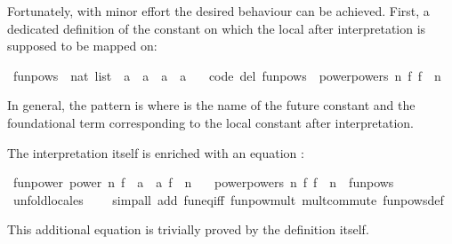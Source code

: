 \begin{isabellebody}
\begin{isamarkuptext}
  Fortunately, with minor effort the desired behaviour can be achieved.
  First, a dedicated definition of the constant on which the local 
  after interpretation is supposed to be mapped on:%
\end{isamarkuptext}%
\isamarkuptrue%
%
\isadelimquote
%
\endisadelimquote
%
\isatagquote
{}\isamarkupfalse%
\ funpows\ {\isacharcolon}{\isacharcolon}\ {\isachardoublequoteopen}nat\ list\ {\isasymRightarrow}\ {\isacharparenleft}{\isacharprime}a\ {\isasymRightarrow}\ {\isacharprime}a{\isacharparenright}\ {\isasymRightarrow}\ {\isacharprime}a\ {\isasymRightarrow}\ {\isacharprime}a{\isachardoublequoteclose}\ \isanewline
\ \ {\isacharbrackleft}code\ del{\isacharbrackright}{\isacharcolon}\ {\isachardoublequoteopen}funpows\ {\isacharequal}\ power{\isachardot}powers\ {\isacharparenleft}{\isasymlambda}n\ f{\isachardot}\ f\ {\isacharcircum}{\isacharcircum}\ n{\isacharparenright}{\isachardoublequoteclose}%
\endisatagquote
{\isafoldquote}%
%
\isadelimquote
%
\endisadelimquote
%
\begin{isamarkuptext}%
\noindent In general, the pattern is  where  is
  the name of the future constant and  the foundational term
  corresponding to the local constant after interpretation.

  The interpretation itself is enriched with an equation :%
\end{isamarkuptext}%
\isamarkuptrue%
%
\isadelimquote
%
\endisadelimquote
%
\isatagquote
{}\isamarkupfalse%
\ fun{\isacharunderscore}power{\isacharcolon}\ power\ {\isachardoublequoteopen}{\isasymlambda}n\ {\isacharparenleft}f\ {\isacharcolon}{\isacharcolon}\ {\isacharprime}a\ {\isasymRightarrow}\ {\isacharprime}a{\isacharparenright}{\isachardot}\ f\ {\isacharcircum}{\isacharcircum}\ n{\isachardoublequoteclose}\ \isanewline
\ \ {\isachardoublequoteopen}power{\isachardot}powers\ {\isacharparenleft}{\isasymlambda}n\ f{\isachardot}\ f\ {\isacharcircum}{\isacharcircum}\ n{\isacharparenright}\ {\isacharequal}\ funpows{\isachardoublequoteclose}\isanewline
\ \ \isamarkupfalse%
\ unfold{\isacharunderscore}locales\isanewline
\ \ \ \ {\isacharparenleft}simp{\isacharunderscore}all\ add{\isacharcolon}\ fun{\isacharunderscore}eq{\isacharunderscore}iff\ funpow{\isacharunderscore}mult\ mult{\isacharunderscore}commute\ funpows{\isacharunderscore}def{\isacharparenright}%
\endisatagquote
{\isafoldquote}%
%
\isadelimquote
%
\endisadelimquote
%
\begin{isamarkuptext}%
\noindent This additional equation is trivially proved by the definition
  itself.


\end{isamarkuptext}
\end{isabellebody}
